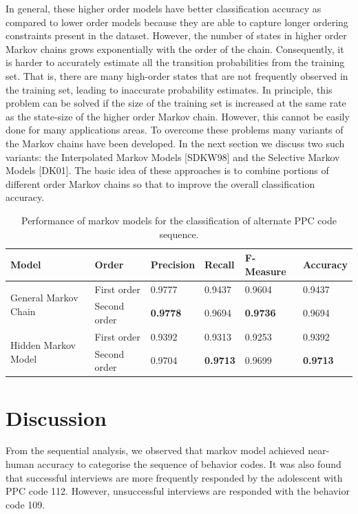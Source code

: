 \documentclass{amia}
\begin{document}
In general, these higher order models have better classification accuracy as compared to lower order models because they are able to capture longer ordering constraints present in the dataset. However, the number of states in higher order Markov chains grows exponentially with the order of the chain. Consequently, it is harder to accurately estimate all the transition probabilities from the training set. That is, there are many high-order states that are not frequently observed in the training set, leading to inaccurate probability estimates. In principle, this problem can be solved if the size of the training set is increased at the same rate as the state-size of the higher order Markov chain. However, this cannot be easily done for many applications areas. To overcome these problems many variants of the Markov chains have been developed. In the next section we discuss two such variants: the Interpolated Markov Models [SDKW98] and the Selective Markov Models [DK01]. The basic idea of these approaches is to combine portions of different order Markov chains so that to improve the overall classification accuracy.\\

\begin{table}[h]
\centering
\caption{Performance of markov models for the classification of alternate PPC code sequence.}
\label{tab:result_alt_seq}
  \begin{tabular}{|l|l|l|l|l|l|}
  \hline
   \textbf{Model} & \textbf{Order}  & \textbf{Precision}  & \textbf{Recall} & \textbf{F-Measure} & \textbf{Accuracy}\\ \hline    
    
 \multirow{2}{*}{General Markov Chain} & First order & 0.9777 & 0.9437 & 0.9604 & 0.9437\\\cline{2-6}
 & Second order & \textbf{0.9778} & 0.9694 & \textbf{0.9736} & 0.9694\\ \hline
 \multirow{2}{*}{Hidden Markov Model} & First order & 0.9392 & 0.9313 & 0.9253 & 0.9392\\ \cline{2-6}
 & Second order & 0.9704 & \textbf{0.9713} & 0.9699  & \textbf{0.9713}\\ \hline
 
  \end{tabular}
\end{table}

\section*{Discussion}
From the sequential analysis, we observed that markov model achieved near-human accuracy to categorise the sequence of behavior codes. It was also found that successful interviews are more frequently responded by the adolescent with PPC code 112. However, unsuccessful interviews are responded with the behavior code 109.
\end{document}
